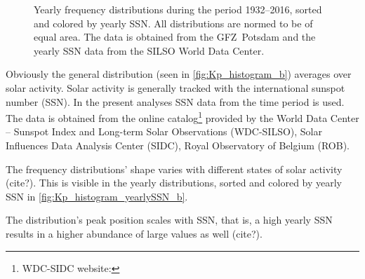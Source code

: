 \begin{figure}[htb]
\begin{floatrow}
{		}{
			\caption{Yearly \Kp{} frequency distributions during the period 1932--2016, sorted and colored by yearly SSN. All distributions are normed to be of equal area. The \Kp{} data is obtained from the GFZ~Potsdam and the yearly SSN data from the SILSO World Data Center.}
			\label{fig:Kp_histogram_yearlySSN_b}
		}
	\end{floatrow}
\end{figure}

Obviously the general \Kp{} distribution (seen in \autoref{fig:Kp_histogram_b}) averages over solar activity. Solar activity is generally tracked with the international sunspot number (SSN). In the present analyses SSN data from the time period \citeyear{sidc1917} is used. The data is obtained from the online catalog\footnote{WDC-SIDC website: } provided by the World Data Center -- Sunspot Index and Long-term Solar Observations (WDC-SILSO), Solar Influences Data Analysis Center (SIDC), Royal Observatory of Belgium (ROB).

The \Kp{} frequency distributions' shape varies with different states of solar activity (cite?). This is visible in the yearly distributions, sorted and colored by yearly SSN in \autoref{fig:Kp_histogram_yearlySSN_b}.

The distribution's peak position scales with SSN, that is, a high yearly SSN results in a higher abundance of large \Kp{} values as well (cite?).

